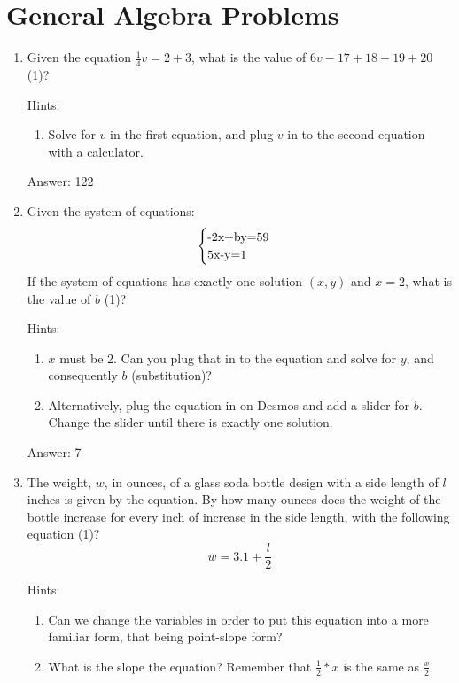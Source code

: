 \documentclass{article}
\begin{document}
\section{General Algebra Problems}

\begin{enumerate}

	\item{Given the equation $\frac{1}{4}v=2+3$, what is the value of $6v-17+18-19+20$ (1)?

	      Hints:
	      \begin{enumerate}
		      \item{Solve for $v$ in the first equation, and plug $v$ in to the second equation with a calculator.}
	      \end{enumerate}

	      Answer: 122}
	\item {Given the system of equations:
	      \[
		      \begin{array}{l}
			      \begin{cases}
				      $-2x+by=59$ & \\
				      $5x-y=1$
			      \end{cases}
		      \end{array}\]
	      If the system of equations has exactly one solution $(x,y)$ and $x=2$, what is the value of $b$ (1)?

	      Hints:
	      \begin{enumerate}
		      \item{$x$ must be 2. Can you plug that in to the equation and solve for $y$, and consequently $b$ (substitution)?}
		      \item{Alternatively, plug the equation in on Desmos and add a slider for $b$. Change the slider until there is exactly one solution.}
	      \end{enumerate}

	      Answer: 7
	      }
	\item {The weight, $w$, in ounces, of a glass soda bottle design with a side length of $l$ inches is given by the equation. By how many ounces does the weight of the bottle increase for every inch of increase in the side length, with the following equation (1)? \[w=3.1 + \frac{l}{2}\]

	      Hints:
	      \begin{enumerate}
		      \item{Can we change the variables in order to put this equation into a more familiar form, that being point-slope form?}
		      \item{What is the slope the equation? Remember that \(\frac{1}{2}*x\) is the same as \(\frac{x}{2}\)}
	      \end{enumerate}

}
\end{enumerate}
\end{document}
